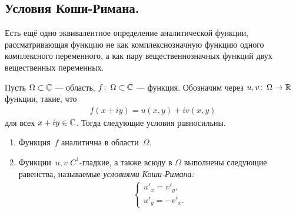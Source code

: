 \documentclass[../complex-analysis.tex]{subfiles}
\begin{document}
\subsection{Условия Коши-Римана.}

Есть ещё одно эквивалентное определение аналитической функции, рассматривающая функцию не как комплекснозначную функцию одного комплексного переменного, а как пару вещественнозначных функций двух вещественных переменных.

\begin{thm}
 \label{theorem:cauchy_riman}
 Пусть $ \Omega \subset \mathbb{C} $ --- область, $ f\colon\,\Omega \subset \mathbb{C} $ --- функция. Обозначим через $ u, v \colon\, \Omega \to \mathbb{R} $ функции, такие, что
 \begin{align*}
  f(x + iy) = u(x, y) + iv(x,y)
 \end{align*} для всех $ x+iy \in \mathbb{C} $. Тогда следующие условия равносильны.
 \begin{enumerate}
  \item \label{enum1:cauchy_riman} Функция~$ f $ аналитична в области~$ \Omega $.
  \item \label{enum2:cauchy_riman} Функции~$ u,v $ $ C^{1} $-гладкие, а также всюду в $ \Omega $ выполнены следующие равенства, называемые \emph{условиями Коши-Римана:}
   \begin{align*}
    \begin{cases}
     u'_x = v'_y, \\
     u'_y = -v'_x.
    \end{cases} 
   \end{align*}
 \end{enumerate}
\end{thm}
\end{document}
